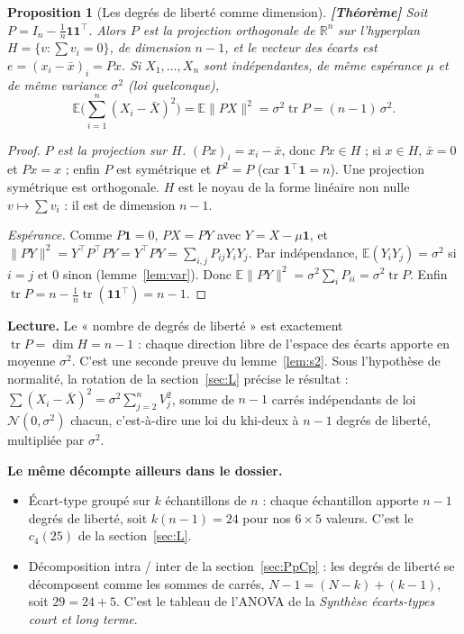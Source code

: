 \documentclass[11pt,a4paper]{article}
\theoremstyle{tq}
\newtheorem{prop}{Proposition}
\theoremstyle{remark}
\newcommand{\thm}{\textcolor{vertTQ}{\textbf{[Théorème]}}}
\newcommand{\E}{\mathbb{E}}
\newcommand{\R}{\mathbb{R}}
\newcommand{\N}{\mathcal{N}}
\newcommand{\Xb}{\bar{X}}
\begin{document}
\begin{prop}[Les degrés de liberté comme dimension]\thm{}
Soit $P=I_n-\frac1n\mathbf 1\mathbf 1^{\top}$. Alors $P$ est la projection orthogonale de $\R^n$ sur l'hyperplan $H=\{v : \sum v_i=0\}$, de dimension $n-1$, et le vecteur des écarts est $e=(x_i-\bar x)_i=Px$. Si $X_1,\dots,X_n$ sont indépendantes, de même espérance $\mu$ et de même variance $\sigma^2$ (loi quelconque),
\[
\E\Big(\sum_{i=1}^n(X_i-\Xb)^2\Big)=\E\|PX\|^2=\sigma^2\operatorname{tr}P=(n-1)\,\sigma^2 .
\]
\end{prop}
\begin{proof}
\emph{$P$ est la projection sur $H$.} $(Px)_i=x_i-\bar x$, donc $Px\in H$ ; si $x\in H$, $\bar x=0$ et $Px=x$ ; enfin $P$ est symétrique et $P^2=P$ (car $\mathbf 1^{\top}\mathbf 1=n$). Une projection symétrique est orthogonale. $H$ est le noyau de la forme linéaire non nulle $v\mapsto\sum v_i$ : il est de dimension $n-1$.

\emph{Espérance.} Comme $P\mathbf 1=0$, $PX=PY$ avec $Y=X-\mu\mathbf 1$, et $\|PY\|^2=Y^{\top}P^{\top}PY=Y^{\top}PY=\sum_{i,j}P_{ij}Y_iY_j$. Par indépendance, $\E(Y_iY_j)=\sigma^2$ si $i=j$ et $0$ sinon (lemme~\ref{lem:var}). Donc $\E\|PY\|^2=\sigma^2\sum_iP_{ii}=\sigma^2\operatorname{tr}P$. Enfin $\operatorname{tr}P=n-\frac1n\operatorname{tr}(\mathbf 1\mathbf 1^{\top})=n-1$.
\end{proof}
\textbf{Lecture.} Le « nombre de degrés de liberté » est exactement $\operatorname{tr}P=\dim H=n-1$ : chaque direction libre de l'espace des écarts apporte en moyenne $\sigma^2$. C'est une seconde preuve du lemme~\ref{lem:s2}. Sous l'hypothèse de normalité, la rotation de la section~\ref{sec:L} précise le résultat : $\sum(X_i-\Xb)^2=\sigma^2\sum_{j=2}^nV_j^2$, somme de $n-1$ carrés indépendants de loi $\N(0,\sigma^2)$ chacun, c'est-à-dire une loi du khi-deux à $n-1$ degrés de liberté, multipliée par $\sigma^2$.

\textbf{Le même décompte ailleurs dans le dossier.}
\begin{itemize}[nosep,leftmargin=1.2em]
\item Écart-type groupé sur $k$ échantillons de $n$ : chaque échantillon apporte $n-1$ degrés de liberté, soit $k(n-1)=24$ pour nos $6\times5$ valeurs. C'est le $c_4(25)$ de la section~\ref{sec:L}.
\item Décomposition intra / inter de la section~\ref{sec:PpCp} : les degrés de liberté se décomposent comme les sommes de carrés, $N-1=(N-k)+(k-1)$, soit $29=24+5$. C'est le tableau de l'ANOVA de la \emph{Synthèse écarts-types court et long terme}.
\end{itemize}
\end{document}
